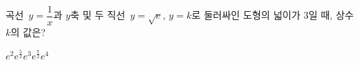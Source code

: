 \hspace*{2mm}\begin{minipage}[t]{\dimexpr\linewidth-2mm\relax}\vspace{0pt}
곡선~$y=\dfrac{1}{x}$과 $y$축 및 두 직선~$y=\sqrt{e}$, $y=k$로 둘러싸인 도형의 넓이가 $3$일 때, 상수 $k$의 값은? 
\begin{choices32}{$e^2$}{$e^{\frac{5}{2}}$}{$e^3$}{$e^{\frac{7}{2}}$}{$e^4$}\end{choices32}\end{minipage}
